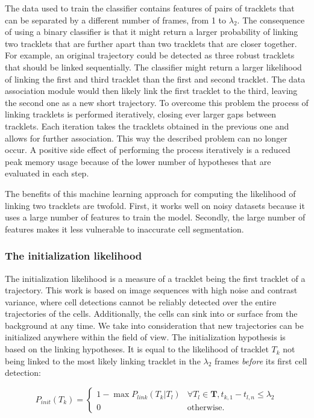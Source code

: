      	   	The data used to train the classifier contains features of pairs of tracklets that can be separated by a different number of frames, from 1 to $\lambda_2$. The consequence of using a binary classifier is that it might return a larger probability of linking two tracklets that are further apart than two tracklets that are closer together. For example, an original trajectory could be detected as three robust tracklets that should be linked sequentially. The classifier might return a larger likelihood of linking the first and third tracklet than the first and second tracklet. The data association module would then likely link the first tracklet to the third, leaving the second one as a new short trajectory. To overcome this problem the process of linking tracklets is performed iteratively, closing ever larger gaps between tracklets. Each iteration takes the tracklets obtained in the previous one and allows for further association. This way the described problem can no longer occur. A positive side effect of performing the process iteratively is a reduced peak memory usage because of the lower number of hypotheses that are evaluated in each step.

     	   	The benefits of this machine learning approach for computing the likelihood of linking two tracklets are twofold. First, it works well on noisy datasets because it uses a large number of features to train the model. Secondly, the large number of features makes it less vulnerable to inaccurate cell segmentation.
     	   	
       	\subsubsection{The initialization likelihood}
       		
       		The initialization likelihood is a measure of a tracklet being the first tracklet of a trajectory. This work is based on image sequences with high noise and contrast variance, where cell detections cannot be reliably detected over the entire trajectories of the cells. Additionally, the cells can sink into or surface from the background at any time. We take into consideration that new trajectories can be initialized anywhere within the field of view. The initialization hypothesis is based on the linking hypotheses. It is equal to the likelihood of tracklet $T_k$ not being linked to the most likely linking tracklet in the $\lambda_2$ frames \textit{before} its first cell detection:
       	
       		\[
       			P_{init}(T_k) = \begin{cases}
       				1 - \max{P_{link}(T_k | T_l)} & \forall T_l \in \textbf{T}, t_{k, 1} - t_{l, n} \leq \lambda_2\\
       				0 & \text{otherwise.}
       			\end{cases}
       		\]
       		
